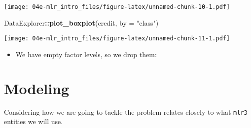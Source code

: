 \documentclass[]{article}
\newenvironment{Shaded}{\begin{snugshade}}{\end{snugshade}}
\newcommand{\DataTypeTok}[1]{\textcolor[rgb]{0.13,0.29,0.53}{#1}}
\newcommand{\KeywordTok}[1]{\textcolor[rgb]{0.13,0.29,0.53}{\textbf{#1}}}
\newcommand{\NormalTok}[1]{#1}
\newcommand{\OperatorTok}[1]{\textcolor[rgb]{0.81,0.36,0.00}{\textbf{#1}}}
\newcommand{\StringTok}[1]{\textcolor[rgb]{0.31,0.60,0.02}{#1}}
\providecommand{\tightlist}{%
  \setlength{\itemsep}{0pt}\setlength{\parskip}{0pt}}
\begin{document}
\texttt{[image: 04e-mlr\_intro\_files/figure-latex/unnamed-chunk-10-1.pdf]}

\begin{Shaded}
\begin{Highlighting}[]
\NormalTok{DataExplorer}\OperatorTok{::}\KeywordTok{plot_boxplot}\NormalTok{(credit, }\DataTypeTok{by =} \StringTok{"class"}\NormalTok{)}
\end{Highlighting}
\end{Shaded}

\texttt{[image: 04e-mlr\_intro\_files/figure-latex/unnamed-chunk-11-1.pdf]}

\begin{itemize}
\tightlist
\item
  We have empty factor levels, so we drop them:
\end{itemize}

\begin{Shaded}
\end{Shaded}

\hypertarget{modeling}{%
\section{Modeling}\label{modeling}}

Considering how we are going to tackle the problem relates closely to
what \texttt{mlr3} entities we will use.
\end{document}
